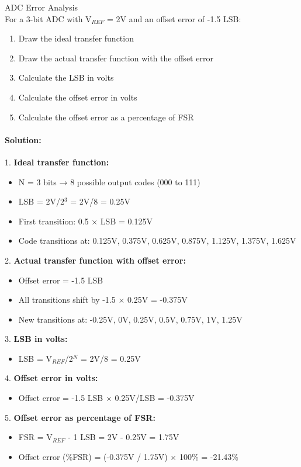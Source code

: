 \begin{example2}{ADC Error Analysis}\\
For a 3-bit ADC with V$_{REF}$ = 2V and an offset error of -1.5 LSB:

\begin{enumerate}
    \item Draw the ideal transfer function
    \item Draw the actual transfer function with the offset error
    \item Calculate the LSB in volts
    \item Calculate the offset error in volts
    \item Calculate the offset error as a percentage of FSR
\end{enumerate}

\paragraph{Solution:}
1. \textbf{Ideal transfer function:}
\begin{itemize}
    \item N = 3 bits → 8 possible output codes (000 to 111)
    \item LSB = 2V/2$^3$ = 2V/8 = 0.25V
    \item First transition: 0.5 × LSB = 0.125V
    \item Code transitions at: 0.125V, 0.375V, 0.625V, 0.875V, 1.125V, 1.375V, 1.625V
\end{itemize}

2. \textbf{Actual transfer function with offset error:}
\begin{itemize}
    \item Offset error = -1.5 LSB
    \item All transitions shift by -1.5 × 0.25V = -0.375V
    \item New transitions at: -0.25V, 0V, 0.25V, 0.5V, 0.75V, 1V, 1.25V
\end{itemize}

3. \textbf{LSB in volts:}
\begin{itemize}
    \item LSB = V$_{REF}$/2$^N$ = 2V/8 = 0.25V
\end{itemize}

4. \textbf{Offset error in volts:}
\begin{itemize}
    \item Offset error = -1.5 LSB × 0.25V/LSB = -0.375V
\end{itemize}

5. \textbf{Offset error as percentage of FSR:}
\begin{itemize}
    \item FSR = V$_{REF}$ - 1 LSB = 2V - 0.25V = 1.75V
    \item Offset error (\%FSR) = (-0.375V / 1.75V) × 100\% = -21.43\%
\end{itemize}
\end{example2}

